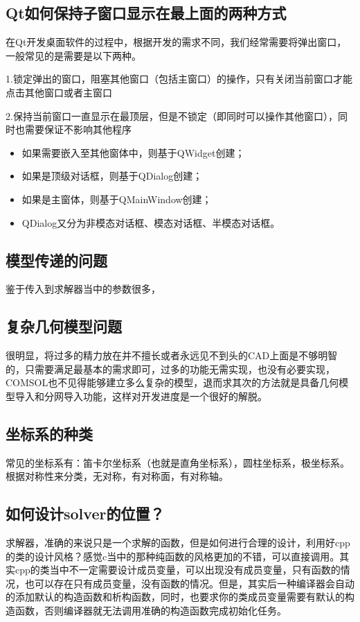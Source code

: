 \subsection{Qt如何保持子窗口显示在最上面的两种方式}
在Qt开发桌面软件的过程中，根据开发的需求不同，我们经常需要将弹出窗口，一般常见的是需要是以下两种。

1.锁定弹出的窗口，阻塞其他窗口（包括主窗口）的操作，只有关闭当前窗口才能点击其他窗口或者主窗口

2.保持当前窗口一直显示在最顶层，但是不锁定（即同时可以操作其他窗口），同时也需要保证不影响其他程序

\begin{itemize}
	\item 如果需要嵌入至其他窗体中，则基于QWidget创建；
	\item 如果是顶级对话框，则基于QDialog创建；
	\item 如果是主窗体，则基于QMainWindow创建；
	\item QDialog又分为非模态对话框、模态对话框、半模态对话框。
\end{itemize}

\subsection{模型传递的问题}
鉴于传入到求解器当中的参数很多，

\subsection{复杂几何模型问题}
很明显，将过多的精力放在并不擅长或者永远见不到头的CAD上面是不够明智的，只需要满足最基本的需求即可，过多的功能无需实现，也没有必要实现，COMSOL也不见得能够建立多么复杂的模型，退而求其次的方法就是具备几何模型导入和分网导入功能，这样对开发进度是一个很好的解脱。
\subsection{坐标系的种类}
常见的坐标系有：笛卡尔坐标系（也就是直角坐标系），圆柱坐标系，极坐标系。根据对称性来分类，无对称，有对称面，有对称轴。
\subsection{如何设计solver的位置？}
求解器，准确的来说只是一个求解的函数，但是如何进行合理的设计，利用好cpp的类的设计风格？感觉c当中的那种纯函数的风格更加的不错，可以直接调用。其实cpp的类当中不一定需要设计成员变量，可以出现没有成员变量，只有函数的情况，也可以存在只有成员变量，没有函数的情况。但是，其实后一种编译器会自动的添加默认的构造函数和析构函数，同时，也要求你的类成员变量需要有默认的构造函数，否则编译器就无法调用准确的构造函数完成初始化任务。
